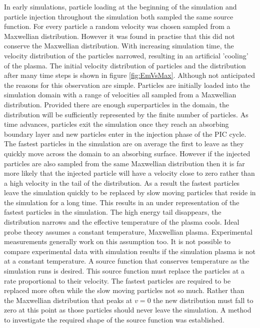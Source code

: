 In early simulations, particle loading at the beginning of the simulation and particle injection throughout the simulation both sampled the same source function. For every particle a random velocity was chosen sampled from a Maxwellian distribution. However it was found in practise that this did not conserve the Maxwellian distribution. With increasing simulation time, the velocity distribution of the particles narrowed, resulting in an artificial 'cooling' of the plasma. The initial velocity distribution of particles and the distribution after many time steps is shown in figure \ref{fig:EmVsMax}. Although not anticipated the reasons for this observation are simple. Particles are initially loaded into the simulation domain with a range of velocities all sampled from a Maxwellian distribution. Provided there are enough superparticles in the domain, the distribution will be sufficiently represented by the finite number of particles. As time advances, particles exit the simulation once they reach an absorbing boundary layer and new particles enter in the injection phase of the PIC cycle. The fastest particles in the simulation are on average the first to leave as they quickly move across the domain to an absorbing surface. However if the injected particles are also sampled from the same Maxwellian distribution then it is far more likely that the injected particle will have a velocity close to zero rather than a high velocity in the tail of the distribution. As a result the fastest particles leave the simulation quickly to be replaced by slow moving particles that reside in the simulation for a long time. This results in an under representation of the fastest particles in the simulation. The high energy tail disappears, the distribution narrows and the effective temperature of the plasma cools. Ideal probe theory assumes a constant temperature, Maxwellian plasma. Experimental measurements generally work on this assumption too. It is not possible to compare experimental data with simulation results if the simulation plasma is not at a constant temperature. A source function that conserves temperature as the simulation runs is desired. This source function must replace the particles at a rate proportional to their velocity. The fastest particles are required to be replaced more often while the slow moving particles not so much. Rather than the Maxwellian distribution that peaks at $v=0$ the new distribution must fall to zero at this point as those particles should never leave the simulation. A method to investigate the required shape of the source function was established.
